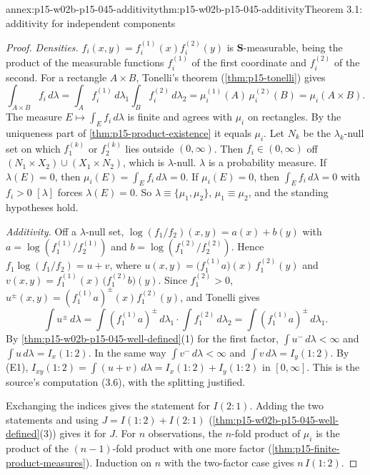 \begin{annexitem}{annex:p15-w02b-p15-045-additivity}{thm:p15-w02b-p15-045-additivity}{Theorem 3.1: additivity for independent components}
\begin{proof}
\emph{Densities.} \(f_i(x,y)=f_i^{(1)}(x)f_i^{(2)}(y)\) is
\(\mathbf S\)-measurable, being the product of the measurable functions
\(f_i^{(1)}\) of the first coordinate and \(f_i^{(2)}\) of the second. For a rectangle
\(A\times B\), Tonelli's theorem (\cref{thm:p15-tonelli}) gives
\[
  \int_{A\times B}f_i\,d\lambda
   =\int_Af_i^{(1)}\,d\lambda_1\int_Bf_i^{(2)}\,d\lambda_2
   =\mu_i^{(1)}(A)\,\mu_i^{(2)}(B)=\mu_i(A\times B).
\]
The measure \(E\mapsto\int_Ef_i\,d\lambda\) is finite and agrees with
\(\mu_i\) on rectangles. By the uniqueness part of
\cref{thm:p15-product-existence} it equals \(\mu_i\). Let \(N_k\) be the
\(\lambda_k\)-null set on which \(f_1^{(k)}\) or \(f_2^{(k)}\) lies
outside \((0,\infty)\). Then \(f_i\in(0,\infty)\) off
\((N_1\times X_2)\cup(X_1\times N_2)\), which is \(\lambda\)-null.
\(\lambda\) is a probability measure. If \(\lambda(E)=0\), then
\(\mu_i(E)=\int_Ef_i\,d\lambda=0\). If \(\mu_i(E)=0\), then
\(\int_Ef_i\,d\lambda=0\) with \(f_i>0\) \([\lambda]\) forces
\(\lambda(E)=0\). So \(\lambda\equiv\{\mu_1,\mu_2\}\), \(\mu_1\equiv\mu_2\),
and the standing hypotheses hold.

\emph{Additivity.} Off a \(\lambda\)-null set,
\(\log(f_1/f_2)(x,y)=a(x)+b(y)\) with
\(a=\log(f_1^{(1)}/f_2^{(1)})\) and \(b=\log(f_1^{(2)}/f_2^{(2)})\).
Hence \(f_1\log(f_1/f_2)=u+v\), where
\(u(x,y)=\bigl(f_1^{(1)}a\bigr)(x)\,f_1^{(2)}(y)\) and
\(v(x,y)=f_1^{(1)}(x)\,\bigl(f_1^{(2)}b\bigr)(y)\). Since
\(f_1^{(2)}>0\), \(u^\pm(x,y)=(f_1^{(1)}a)^\pm(x)f_1^{(2)}(y)\), and
Tonelli gives
\[
  \int u^\pm\,d\lambda=\int(f_1^{(1)}a)^\pm\,d\lambda_1\cdot\int f_1^{(2)}\,d\lambda_2
                     =\int(f_1^{(1)}a)^\pm\,d\lambda_1 .
\]
By \cref{thm:p15-w02b-p15-045-well-defined}(1) for the first factor,
\(\int u^-\,d\lambda<\infty\) and \(\int u\,d\lambda=I_x(1:2)\). In the
same way \(\int v^-\,d\lambda<\infty\) and \(\int v\,d\lambda=I_y(1:2)\).
By (E1), \(I_{xy}(1:2)=\int(u+v)\,d\lambda=I_x(1:2)+I_y(1:2)\) in
\([0,\infty]\). This is the source's computation (3.6), with the
splitting justified.

Exchanging the indices gives the statement for \(I(2:1)\). Adding the
two statements and using \(J=I(1:2)+I(2:1)\)
(\cref{thm:p15-w02b-p15-045-well-defined}(3)) gives it for \(J\). For
\(n\) observations, the \(n\)-fold product of \(\mu_i\) is the product of
the \((n-1)\)-fold product with one more factor
(\cref{thm:p15-finite-product-measures}). Induction on \(n\) with the
two-factor case gives \(n\,I(1:2)\).
\end{proof}
\end{annexitem}

